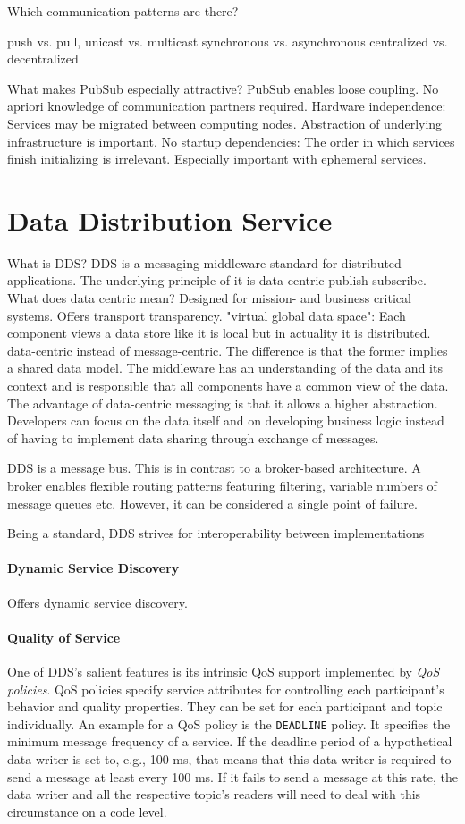 Which communication patterns are there?

push vs. pull,
unicast vs. multicast
synchronous vs. asynchronous
centralized vs. decentralized

What makes PubSub especially attractive?
PubSub enables loose coupling. No apriori knowledge of communication partners required. Hardware independence: Services may be migrated between computing nodes. Abstraction of underlying infrastructure is important.
No startup dependencies: The order in which services finish initializing is irrelevant. Especially important with ephemeral services.


\section{Data Distribution Service}

What is DDS?
DDS is a messaging middleware standard for distributed applications. 
The underlying principle of it is data centric publish-subscribe.
What does data centric mean?
Designed for mission- and business critical systems.
Offers transport transparency.
"virtual global data space": Each component views a data store like it is local but in actuality it is distributed.
data-centric instead of message-centric. The difference is that the former implies a shared data model. The middleware has an understanding of the data and its context and is responsible that all components have a common view of the data.
The advantage of data-centric messaging is that it allows a higher abstraction. Developers can focus on the data itself and on developing business logic instead of having to implement data sharing through exchange of messages.

DDS is a message bus. This is in contrast to a broker-based architecture. A broker enables flexible routing patterns featuring filtering, variable numbers of message queues etc. However, it can be considered a single point of failure.

Being a standard, DDS strives for interoperability between implementations

\paragraph{Dynamic Service Discovery}
Offers dynamic service discovery.


\paragraph{Quality of Service}
One of DDS's salient features is its intrinsic QoS support implemented by \emph{QoS policies}.
QoS policies specify service attributes for controlling each participant's behavior and quality properties. They can be set for each participant and topic individually. An example for a QoS policy is the \texttt{DEADLINE} policy. It specifies the minimum message frequency of a service. If the deadline period of a hypothetical data writer is set to, e.g., 100 ms, that means that this data writer is required to send a message at least every 100 ms. If it fails to send a message at this rate, the data writer and all the respective topic's readers will need to deal with this circumstance on a code level. 

